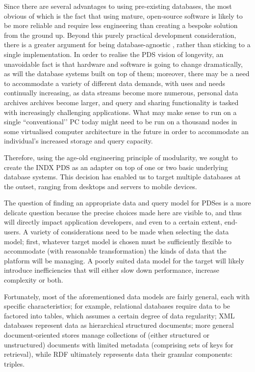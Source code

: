 \documentclass[runningheads,a4paper]{llncs}
\begin{document}
Since there are several advantages to using pre-existing databases, the most obvious of which is the fact that using mature, open-source software is likely to be more reliable and require less engineering than creating a bespoke solution from the ground up. Beyond this purely practical development consideration, there is a greater argument for being database-agnostic \cite{databseagnostic}, rather than sticking to a single implementation.  In order to realise the PDS vision of longevity, an unavoidable fact is that hardware and software is going to change dramatically, as will the database systems built on top of them; moreover, there may be a need to accommodate a variety of different data demands, with uses and needs continually increasing, as data streams become more numerous, personal data archives archives become larger, and query and sharing functionality is tasked with increasingly challenging applications.  What may make sense to run on a single ``conventional’’ PC today might need to be run on a thousand nodes in some virtualised computer architecture in the future in order to accommodate an individual’s increased storage and query capacity.

Therefore, using the age-old engineering principle of modularity, we sought to create the INDX PDS as an adapter on top of one or two basic underlying database systems.  This decision has enabled us to target multiple databases at the outset, ranging from desktops and servers to mobile devices. 

The question of finding an appropriate data and query model for PDSes is a more delicate question because the precise choices made here are visible to, and thus will directly impact application developers, and even to a certain extent, end-users.  A variety of considerations need to be made when selecting the data model; first, whatever target model is chosen must be sufficiently flexible to accommodate (with reasonable transformation) the kinds of data that the platform will be managing.  A poorly suited data model for the target will likely introduce inefficiencies that will either slow down performance, increase complexity or both.

Fortunately, most of the aforementioned data models are fairly general, each with specific characteristics; for example, relational databases require data to be factored into tables, which assumes a certain degree of data regularity; XML databases represent data as hierarchical structured documents; more general document-oriented stores manage collections of (either structured or unstructured) documents with limited metadata (comprising sets of keys for retrieval), while RDF ultimately represents data their granular components: triples.  
\end{document}
